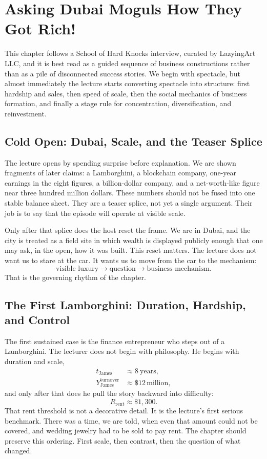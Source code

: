 \chapter{Asking Dubai Moguls How They Got Rich!}

This chapter follows a School of Hard Knocks interview, curated by LazyingArt LLC, and it is best read as a guided sequence of business constructions rather than as a pile of disconnected success stories. We begin with spectacle, but almost immediately the lecture starts converting spectacle into structure: first hardship and sales, then speed of scale, then the social mechanics of business formation, and finally a stage rule for concentration, diversification, and reinvestment.

\section{Cold Open: Dubai, Scale, and the Teaser Splice}

The lecture opens by spending surprise before explanation. We are shown fragments of later claims: a Lamborghini, a blockchain company, one-year earnings in the eight figures, a billion-dollar company, and a net-worth-like figure near three hundred million dollars. These numbers should not be fused into one stable balance sheet. They are a teaser splice, not yet a single argument. Their job is to say that the episode will operate at visible scale.

Only after that splice does the host reset the frame. We are in Dubai, and the city is treated as a field site in which wealth is displayed publicly enough that one may ask, in the open, how it was built. This reset matters. The lecture does not want us to stare at the car. It wants us to move from the car to the mechanism:
\begin{equation}
\text{visible luxury}
\to
\text{question}
\to
\text{business mechanism}.
\end{equation}
That is the governing rhythm of the chapter.

\section{The First Lamborghini: Duration, Hardship, and Control}

The first sustained case is the finance entrepreneur who steps out of a Lamborghini. The lecturer does not begin with philosophy. He begins with duration and scale,
\begin{align}
t_{\text{James}} &\approx 8\ \text{years}, \\
Y_{\text{James}}^{\text{turnover}} &\approx \$12\,\text{million},
\end{align}
and only after that does he pull the story backward into difficulty:
\begin{equation}
R_{\text{rent}} \approx \$1{,}300.
\end{equation}
That rent threshold is not a decorative detail. It is the lecture's first serious benchmark. There was a time, we are told, when even that amount could not be covered, and wedding jewelry had to be sold to pay rent. The chapter should preserve this ordering. First scale, then contrast, then the question of what changed.

